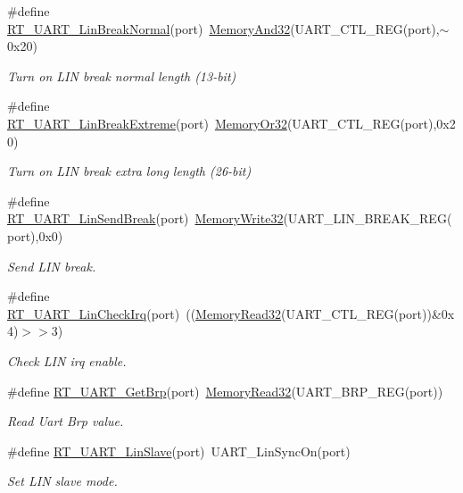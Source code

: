 \begin{DoxyCompactItemize}
\#define \mbox{\hyperlink{a00056_a45d1e1116c5b535f276acc73e522570f}{R\+T\+\_\+\+U\+A\+R\+T\+\_\+\+Lin\+Break\+Normal}}(port)~\mbox{\hyperlink{a00020_ad87cedffcaadc51db22594fce55173d4}{Memory\+And32}}(U\+A\+R\+T\+\_\+\+C\+T\+L\+\_\+\+R\+EG(port),$\sim$0x20)
\begin{DoxyCompactList}\small\item\em Turn on L\+IN break normal length (13-\/bit) \end{DoxyCompactList}\item 
\#define \mbox{\hyperlink{a00056_a9e7d98206f07485a3347bab6672a971c}{R\+T\+\_\+\+U\+A\+R\+T\+\_\+\+Lin\+Break\+Extreme}}(port)~\mbox{\hyperlink{a00020_a27874a97deab7cecdde5ddecf466e31e}{Memory\+Or32}}(U\+A\+R\+T\+\_\+\+C\+T\+L\+\_\+\+R\+EG(port),0x20)
\begin{DoxyCompactList}\small\item\em Turn on L\+IN break extra long length (26-\/bit) \end{DoxyCompactList}\item 
\#define \mbox{\hyperlink{a00056_ad1e6c13693e5ea54a55ce78635617178}{R\+T\+\_\+\+U\+A\+R\+T\+\_\+\+Lin\+Send\+Break}}(port)~\mbox{\hyperlink{a00020_a6b9732365b12e48ddb89fe1028b975b0}{Memory\+Write32}}(U\+A\+R\+T\+\_\+\+L\+I\+N\+\_\+\+B\+R\+E\+A\+K\+\_\+\+R\+EG(port),0x0)
\begin{DoxyCompactList}\small\item\em Send L\+IN break. \end{DoxyCompactList}\item 
\#define \mbox{\hyperlink{a00056_a2e2715198f9716282584f34a7f472649}{R\+T\+\_\+\+U\+A\+R\+T\+\_\+\+Lin\+Check\+Irq}}(port)~((\mbox{\hyperlink{a00020_a2d484dc15bdf30ee11ab3b05f31f0e16}{Memory\+Read32}}(U\+A\+R\+T\+\_\+\+C\+T\+L\+\_\+\+R\+EG(port))\&0x4)$>$$>$3)
\begin{DoxyCompactList}\small\item\em Check L\+IN irq enable. \end{DoxyCompactList}\item 
\#define \mbox{\hyperlink{a00056_a74f1bca1f0b60eeec1f84bcba3e34919}{R\+T\+\_\+\+U\+A\+R\+T\+\_\+\+Get\+Brp}}(port)~\mbox{\hyperlink{a00020_a2d484dc15bdf30ee11ab3b05f31f0e16}{Memory\+Read32}}(U\+A\+R\+T\+\_\+\+B\+R\+P\+\_\+\+R\+EG(port))
\begin{DoxyCompactList}\small\item\em Read Uart Brp value. \end{DoxyCompactList}\item 
\#define \mbox{\hyperlink{a00056_a3f9518fa74ec401803fe1d15e0d39ff2}{R\+T\+\_\+\+U\+A\+R\+T\+\_\+\+Lin\+Slave}}(port)~U\+A\+R\+T\+\_\+\+Lin\+Sync\+On(port)
\begin{DoxyCompactList}\small\item\em Set L\+IN slave mode. \end{DoxyCompactList}\end{DoxyCompactItemize}
